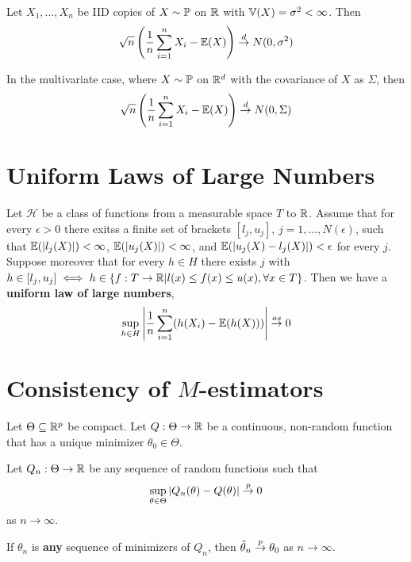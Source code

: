 \begin{thm}
  \label{defn:stochastic_convergence_concepts:2}
  Let $X_{1}, \dots, X_{n}$ be IID copies of $X \sim \Prob$ on $\mathbb{R}$
  with $\Var{X} = \sigma^{2} < \infty$. Then
  \begin{equation}
    \label{eq:19}
    \sqrt{n}\left(\frac{1}{n} \sum_{i=1}^{n} X_{i} - \E{X}\right) \cd N(0, \sigma^{2})
  \end{equation}

  In the multivariate case, where $X \sim \Prob$ on $\mathbb{R}^{d}$ with the
  covariance of $X$ as $\Sigma$, then
  \begin{equation}
    \label{eq:21}
    \sqrt{n} \left(\frac{1}{n} \sum_{i=1}^{n} X_{i} - \E{X}\right) \cd N(0, \Sigma)
  \end{equation}
\end{thm}

\section{Uniform Laws of Large Numbers}
\label{sec:uniform-laws-large}

\begin{thm}
  Let $\mathcal{H}$ be a class of functions from a measurable space
  $T$ to $\mathbb{R}$. Assume that for every $\epsilon > 0$ there exitss a
  finite set of brackets $[l_{j}, u_{j}]$, $j = 1, \dots,
  N(\epsilon)$, such that $\E{|l_{j}(X)|} < \infty$, $\E{|u_{j}(X)|} <
  \infty$, and $\E{|u_{j}(X) - l_{j}(X)|} < \epsilon$ for every $j$.
  Suppose moreover that for every $h \in H$ there exists $j$ with $h
  \in [l_{j}, u_{j}] \iff h \in \{ f: T \rightarrow \mathbb{R} | l(x) \leq
  f(x) \leq u(x), \forall x \in T \}$. Then we have a \textbf{uniform
    law of large numbers},
  \begin{equation}
    \label{eq:1}
    \sup_{h \in H} \left| \frac{1}{n} \sum_{i=1}^{n} (h(X_{i}) -
      \E{h(X)}) \right| \cas 0
  \end{equation}
\end{thm}

\section{Consistency of $M$-estimators}
\label{sec:cons-m-estim}

\begin{thm}
  \label{defn:parametric_statistical_models:1}
  Let $\Theta \subseteq \mathbb{R}^{p}$ be compact.  Let $Q: \Theta
  \rightarrow \mathbb{R}$ be a continuous, non-random function that has a
  unique minimizer $\theta_{0} \in \Theta$.

  Let $Q_{n}: \Theta \rightarrow \mathbb{R}$ be any sequence of random
  functions such that
  \begin{equation}
    \label{eq:32}
    \sup_{\theta \in \Theta} |Q_{n}(\theta) - Q(\theta)| \overset{p}{\rightarrow} 0
  \end{equation} as $n \rightarrow \infty$.

  If $\theta_{n}$ is \textbf{any} sequence of minimizers of $Q_{n}$,
  then $\hat \theta_{n} \overset{p}{\rightarrow} \theta_{0}$ as $n \rightarrow \infty$.
\end{thm}

